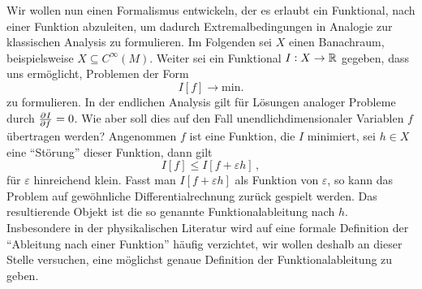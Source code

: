 Wir wollen nun einen Formalismus entwickeln, der es erlaubt ein Funktional, nach
einer Funktion abzuleiten, um dadurch Extremalbedingungen in
Analogie zur klassischen Analysis zu formulieren.
Im Folgenden sei $X$ einen Banachraum, beispielsweise $X\subseteq C^\infty(M)$.
Weiter sei ein Funktional $I:X\to\mathbb{R}$ gegeben, dass uns ermöglicht, Problemen
der Form
\begin{equation}
I[f]\to \mathrm{min.}
\end{equation}
zu formulieren. In der endlichen Analysis gilt für Lösungen analoger
Probleme durch $\pd{I}{f}=0$.
Wie aber soll dies auf den Fall unendlichdimensionaler Variablen $f$ übertragen
werden?
Angenommen $f$ ist eine Funktion, die $I$ minimiert, sei $h\in X$ eine
"`Störung"' dieser Funktion, dann gilt
\begin{equation}
I[f]\leq I[f+\varepsilon h]\,,
\end{equation}
für $\varepsilon$ hinreichend klein. Fasst man $I[f+\varepsilon h]$ als Funktion
von $\varepsilon$, so kann das Problem auf gewöhnliche Differentialrechnung
zurück gespielt werden.
Das resultierende Objekt ist die so genannte Funktionalableitung nach $h$.
Insbesondere in der physikalischen Literatur wird auf
eine formale Definition der "`Ableitung nach einer Funktion"' häufig verzichtet, wir
wollen deshalb an dieser Stelle versuchen, eine möglichst genaue Definition der
Funktionalableitung zu geben.
